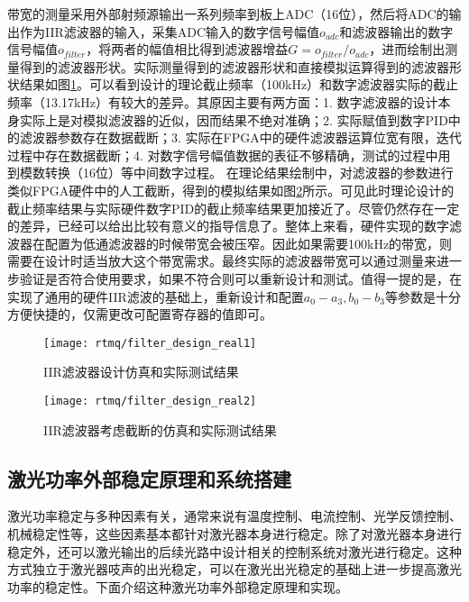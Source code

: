 带宽的测量采用外部射频源输出一系列频率到板上ADC（16位），然后将ADC的输出作为IIR滤波器的输入，采集ADC输入的数字信号幅值$o_{adc}$和滤波器输出的数字信号幅值$o_{filter}$，将两者的幅值相比得到滤波器增益$G=o_{filter}/o_{adc}$，进而绘制出测量得到的滤波器形状。实际测量得到的滤波器形状和直接模拟运算得到的滤波器形状结果如图\ref{fig:filter_design_real1}。可以看到设计的理论截止频率（100kHz）和数字滤波器实际的截止频率（13.17kHz）有较大的差异。其原因主要有两方面：1. 数字滤波器的设计本身实际上是对模拟滤波器的近似，因而结果不绝对准确；2. 实际赋值到数字PID中的滤波器参数存在数据截断；3. 实际在FPGA中的硬件滤波器运算位宽有限，迭代过程中存在数据截断；4. 对数字信号幅值数据的表征不够精确，测试的过程中用到模数转换（16位）等中间数字过程。
在理论结果绘制中，对滤波器的参数进行类似FPGA硬件中的人工截断，得到的模拟结果如图\ref{fig:filter_design_real2}所示。可见此时理论设计的截止频率结果与实际硬件数字PID的截止频率结果更加接近了。尽管仍然存在一定的差异，已经可以给出比较有意义的指导信息了。整体上来看，硬件实现的数字滤波器在配置为低通滤波器的时候带宽会被压窄。因此如果需要100kHz的带宽，则需要在设计时适当放大这个带宽需求。最终实际的滤波器带宽可以通过测量来进一步验证是否符合使用要求，如果不符合则可以重新设计和测试。值得一提的是，在实现了通用的硬件IIR滤波的基础上，重新设计和配置$a_0-a_3, b_0-b_3$等参数是十分方便快捷的，仅需更改可配置寄存器的值即可。

\begin{figure}
    \centering
    \caption[IIR滤波器设计仿真和实际测试结果]{IIR滤波器设计仿真和实际测试结果\label{fig:filter_design_real1}}
    \texttt{[image: rtmq/filter\_design\_real1]}
\end{figure}



\begin{figure}
    \centering
    \caption[IIR滤波器考虑截断的仿真和实际测试结果]{IIR滤波器考虑截断的仿真和实际测试结果\label{fig:filter_design_real2}}
    \texttt{[image: rtmq/filter\_design\_real2]}
\end{figure}

\newpage
\subsection[激光功率外部稳定原理和系统搭建]{激光功率外部稳定原理和系统搭建}
激光功率稳定与多种因素有关，通常来说有温度控制、电流控制、光学反馈控制、机械稳定性等，这些因素基本都针对激光器本身进行稳定。除了对激光器本身进行稳定外，还可以激光输出的后续光路中设计相关的控制系统对激光进行稳定。这种方式独立于激光器吱声的出光稳定，可以在激光出光稳定的基础上进一步提高激光功率的稳定性。下面介绍这种激光功率外部稳定原理和实现。

